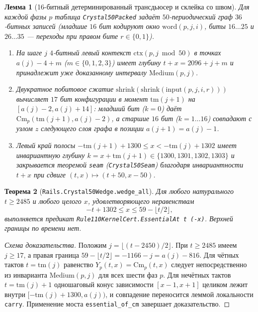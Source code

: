 \documentclass[11pt, a4paper]{article}
\newtheorem{theorem}{Теорема}[section]
\newtheorem{lemma}[theorem]{Лемма}
\begin{document}
\begin{lemma}[16-битный детерминированный трансдьюсер и склейка со швом]\label{lem:transducer}
Для каждой фазы $p$ таблица \texttt{Crystal50Packed} задаёт $50$-периодический граф $36$-битных записей (младшие $16$ бит кодируют окно $\mathrm{word}(p, j, i)$, биты $16\dots 25$ и $26\dots 35$ — переходы при правом бите $r \in \{0, 1\}$).
\begin{enumerate}[label=(\alph*)]
    \item На шаге $j$ $4$-битный левый контекст $\mathrm{ctx}(p, j \bmod 50)$ в точках $a(j) - 4 + m$ ($m \in \{0, 1, 2, 3\}$) имеет глубину $t + x = 2096 + j + m$ и принадлежит уже доказанному интервалу $\mathrm{Medium}(p, j)$.
    \item Двукратное побитовое сжатие $\mathrm{shrink}(\mathrm{shrink}(\mathrm{input}(p, j, i, r)))$ вычисляет $17$ бит конфигурации в момент $\mathrm{tm}(j+1)$ на $[a(j)-2, a(j)+14]$: младший бит ($k=0$) даёт $\mathrm{Cm}_p(\mathrm{tm}(j+1), a(j) - 2)$, а старшие $16$ бит ($k=1\dots 16$) совпадают с узлом $z$ следующего слоя графа в позиции $a(j+1) = a(j) - 1$.
    \item Левый край полосы $-\mathrm{tm}(j+1) + 1300 \le x < -\mathrm{tm}(j) + 1302$ имеет инвариантную глубину $k = x + \mathrm{tm}(j+1) \in \{1300,1301,1302,1303\}$ и закрывается теоремой \texttt{seam} (\texttt{Crystal50Seam}) благодаря инвариантности $t + x$ при сдвиге $(t, x) \mapsto (t + 50, x - 50)$.
\end{enumerate}
\end{lemma}

\begin{theorem}[\texttt{Rails.Crystal50Wedge.wedge\_all}]\label{thm:wedge_all}
Для любого натурального $t \ge 2485$ и любого целого $x$, удовлетворяющего неравенствам
\begin{equation}\label{eq:wedge_region}
-t + 1302 \le x \le 59 - \lfloor t/2 \rfloor,
\end{equation}
выполняется предикат \texttt{Rule110KernelCert.EssentialAt t (-x)}. Верхней границы по времени нет.
\end{theorem}

\begin{proof}[Схема доказательства]
Положим $j = \lfloor (t - 2450) / 2 \rfloor$. При $t \ge 2485$ имеем $j \ge 17$, а правая граница $59 - \lfloor t/2 \rfloor = -1166 - j = a(j) - 816$. Для чётных тактов $t = \mathrm{tm}(j)$ равенство $Y_p(t, x) = \mathrm{Cm}_p(t, x)$ следует непосредственно из инварианта $\mathrm{Medium}(p, j)$ для всех шести фаз $p$. Для нечётных тактов $t = \mathrm{tm}(j) + 1$ одношаговый конус зависимости $[x - 1, x + 1]$ целиком лежит внутри $[-\mathrm{tm}(j) + 1300, a(j))$, и совпадение переносится леммой локальности \texttt{carry}. Применение моста \texttt{essential\_of\_cm} завершает доказательство.
\end{proof}
\end{document}
